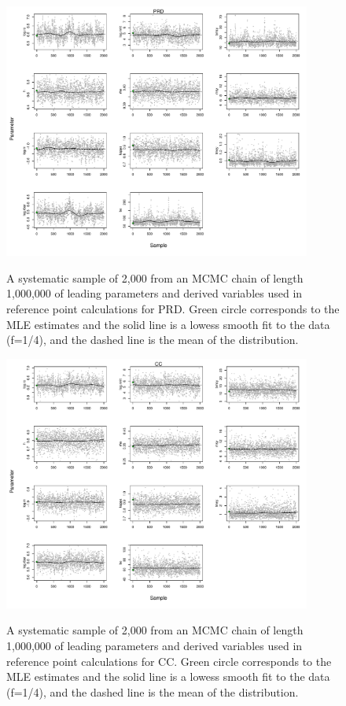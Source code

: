 \begin{figure}
	\includegraphics[width=0.9\textwidth]{../FIGS/qPriorFigs/iscam_fig_trace_PRD.pdf}\\
	\caption{A systematic sample of 2,000 from an MCMC chain of length 1,000,000 of leading parameters and derived variables used in reference point calculations for PRD. Green circle corresponds to the MLE estimates and the solid line is a lowess smooth fit to the data (f=1/4), and the dashed line is the mean of the distribution.}\label{PartII:MCMC:tracePRD}
\end{figure}

\begin{figure}
	\includegraphics[width=0.9\textwidth]{../FIGS/qPriorFigs/iscam_fig_trace_CC.pdf}\\
	\caption{A systematic sample of 2,000 from an MCMC chain of length 1,000,000 of leading parameters and derived variables used in reference point calculations for CC. Green circle corresponds to the MLE estimates and the solid line is a lowess smooth fit to the data (f=1/4), and the dashed line is the mean of the distribution.}\label{PartII:MCMC:traceCC}
\end{figure}

